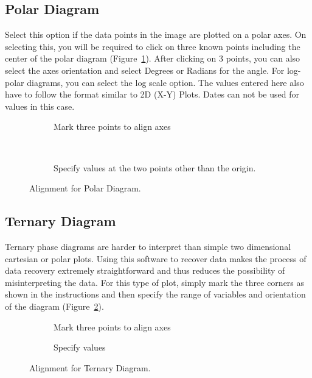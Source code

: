 \documentclass[letterpaper, 11pt]{article}
\begin{document}
\subsection{Polar Diagram}
Select this option if the data points in the image are plotted on a polar axes. On selecting this, you will be required to click on three known points including the center of the polar diagram (Figure~\ref{fig:polarAlignment}). After clicking on 3 points, you can also select the axes orientation and select Degrees or Radians for the angle. For log-polar diagrams, you can select the log scale option. The values entered here also have to follow the format similar to 2D (X-Y) Plots. Dates can not be used for values in this case.

\begin{figure}[h]
\centering
{\begin{subfigure}[b]{0.5\textwidth}
\caption{Mark three points to align axes}
\end{subfigure}
\\
\vspace{5mm}
\begin{subfigure}[b]{0.5\textwidth}
\caption{Specify values at the two points other than the origin.}
\end{subfigure}}
\caption{Alignment for Polar Diagram.}
\label{fig:polarAlignment}
\end{figure}
 
\subsection{Ternary Diagram}
Ternary phase diagrams are harder to interpret than simple two dimensional cartesian or polar plots. Using this software to recover data makes the process of data recovery extremely straightforward and thus reduces the possibility of misinterpreting the data. For this type of plot, simply mark the three corners as shown in the instructions and then specify the range of variables and orientation of the diagram (Figure~\ref{fig:ternaryAlignment}).

\begin{figure}[h]
\centering
{\begin{subfigure}[b]{0.4\textwidth}
\caption{Mark three points to align axes}
\end{subfigure}
\hspace{5mm}
\begin{subfigure}[b]{0.45\textwidth}
\caption{Specify values}
\end{subfigure}}
\caption{Alignment for Ternary Diagram.}
\label{fig:ternaryAlignment}
\end{figure}
\end{document}
